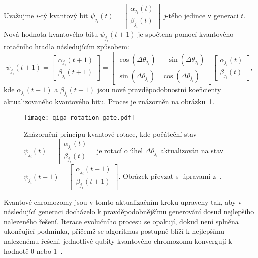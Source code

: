 Uvažujme $i$-tý kvantový bit $\psi_{j_i}\left(t\right) = \begin{bmatrix} \alpha_{j_i}\left(t\right) \\ \beta_{j_i}\left(t\right) \end{bmatrix}$ $j$-tého jedince v generaci $t$. 
Nová hodnota kvantového bitu $\psi_{j_i}\left(t+1\right)$ je spočtena pomocí kvantového rotačního hradla následujícím způsobem:
\begin{equation*}\label{eq:qiga-rotation-gate-angles}
    \psi_{j_i}\left(t+1\right) =
    \begin{bmatrix}
        \alpha_{j_i}\left(t+1\right) \\
        \beta_{j_i}\left(t+1\right)
    \end{bmatrix}
    =
    \begin{bmatrix}
        \cos{\left( \Delta\theta_{j_i} \right)} & - \sin{\left( \Delta\theta_{j_i} \right)} \\
        \sin{\left( \Delta\theta_{j_i} \right)} &   \cos{\left( \Delta\theta_{j_i} \right)}
    \end{bmatrix}
    \begin{bmatrix}
        \alpha_{j_i}\left(t\right) \\
        \beta_{j_i}\left(t\right) 
    \end{bmatrix},
\end{equation*}
kde $\alpha_{j_i}\left(t+1\right)$ a $\beta_{j_i}\left(t+1\right)$ jsou nové pravděpodobnostní koeficienty aktualizovaného kvantového bitu. Proces je znázorněn na obrázku~\ref{fig:qiga-rotation-gate}.

\begin{figure}[ht!]
    \centering
    \texttt{[image: qiga-rotation-gate.pdf]}
    \caption{Znázornění principu kvantové rotace, kde počáteční stav $\psi_{j_i}\left(t\right) = \begin{bmatrix} \alpha_{j_i}\left(t\right) \\ \beta_{j_i}\left(t\right) \end{bmatrix}$ je rotací o úhel $\Delta\theta_{j_i}$ aktualizován na stav $\psi_{j_i}\left(t+1\right) = \begin{bmatrix} \alpha_{j_i}\left(t+1\right) \\ \beta_{j_i}\left(t+1\right) \end{bmatrix}$. Obrázek převzat s~úpravami z~\cite{qisa}.}
    \label{fig:qiga-rotation-gate}
\end{figure}

Kvantové chromozomy jsou v tomto aktualizačním kroku upraveny tak, aby v následující generaci docházelo k pravděpodobnějšímu generování dosud nejlepšího nalezeného řešení. 
Iterace evolučního procesu se opakují, dokud není splněna ukončující podmínka, přičemž se algoritmus postupně blíží k nejlepšímu nalezenému řešení, jednotlivé qubity kvantového chromozomu konvergují k hodnotě 0 nebo 1~\cite{NaturalComputing,qiga}.

